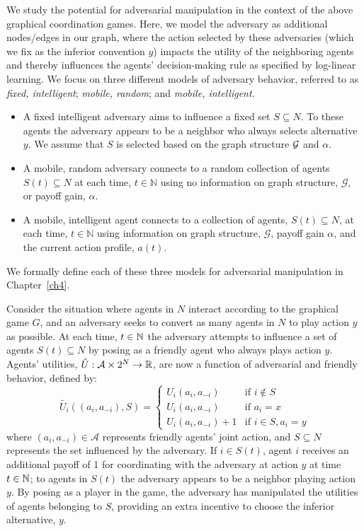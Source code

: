 We study the potential for adversarial manipulation in the context of the above graphical coordination games. Here, we model the adversary as additional nodes/edges in our graph, where the action selected by these adversaries (which we fix as the inferior convention $y$) impacts the utility of the neighboring agents and thereby influences the agents' decision-making rule as specified by log-linear learning.  We focus on three different models of adversary behavior, referred to as {\it fixed, intelligent}; {\it mobile, random}; and {\it mobile, intelligent}.
%
\begin{itemize}
%
\item A fixed intelligent adversary aims to influence a fixed set $S\subseteq N$. To these agents the adversary appears to be a neighbor who always selects alternative  $y$.  We assume that $S$ is selected based on the graph structure ${\cal G}$ and $\alpha$.   
%
\item A mobile, random adversary connects to a random collection of agents $S(t)\subseteq N$ at each time, $t\in \mathbb{N}$ using no information on graph structure, $\mathcal{G},$ or payoff gain, $\alpha.$ 
%
\item A mobile, intelligent agent connects to a collection of agents, $S(t)\subseteq N$, at each time, $t\in \mathbb{N}$ using information on graph structure, $\mathcal{G}$, payoff gain $\alpha$, and the current action profile, $a(t)$.  
%
\end{itemize}
%
We formally define each of these three models for adversarial manipulation in Chapter~\ref{ch4}.

Consider the situation where agents in $N$ interact according to the graphical game $G$, and an adversary seeks to  convert as many agents in $N$ to play action $y$ as possible. 
At each time, $t\in \mathbb{N}$ the adversary attempts to influence a set of agents $S(t)\subseteq N$ by posing as a friendly agent who always plays action $y$. Agents' utilities, $\tilde{U}:\mathcal{A}\times 2^N\to\mathbb{R}$, are now a function of adversarial and friendly behavior, defined by:
\begin{equation}\label{e:new utility}
\tilde{U_i}((a_i,a_{-i}),S) = %
\begin{cases}
U_i(a_i,a_{-i})	&\text{if } i\notin S\\
U_i(a_i,a_{-i})	&\text{if } a_i = x\\
U_i(a_i,a_{-i}) + 1 &\text{if } i\in S,  a_i = y 
\end{cases}
\end{equation}
where $(a_i,a_{-i})\in\mathcal{A}$ represents friendly agents' joint action, and $S\subseteq N$ represents the set influenced by the adversary.
If  $i\in S(t)$, agent $i$ receives an additional payoff of 1 for coordinating with the adversary at action $y$ at time $t\in\mathbb{N}$; to agents in $S(t)$ the adversary appears to be a neighbor playing action $y$. By posing as a player in the game, the adversary has manipulated the utilities of agents belonging to $S$, providing an extra incentive to choose the inferior alternative, $y$. 

